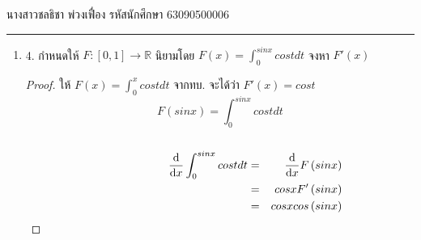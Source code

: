 \documentclass[12pt, a4paper]{article}
\begin{document}
\raggedleft นางสาวชลธิชา พ่วงเฟื่อง  รหัสนักศึกษา 63090500006 \\[12pt]
\hrule\vspace{12pt}
\raggedright

\begin{enumerate}
    \item 4. กำหนดให้ $F:[0,1]\rightarrow \mathbb{R}$ นิยามโดย $F\left ( x \right )=\int_{0}^{sin x} cos t dt$ จงหา ${F}'\left ( x \right )$\indent \\
    \begin{proof}  
        \hspace{1cm} ให้ $F\left ( x \right )=\int_{0}^{ x} cos t dt$ จากทบ. จะได้ว่า ${F}'\left ( x \right )=cos t $\\
        \hspace{2.2cm} $$F\left ( sin x \right )=\int_{0}^{ sin x} cos t dt$$ \\
    \begin{eqnarray*}
        \hspace{2.2cm} \frac{\mathrm{d} }{\mathrm{d} x}\int_{0}^{sin x} cos t dt &=& \frac{\mathrm{d} }{\mathrm{d} x}F\left ( sin x \right )\\
        &=&cos x {F}'\left ( sinx \right )\\
        &=&cos x  cos\left ( sinx \right )\\
    \end{eqnarray*}
    \end{proof}

\end{enumerate}
\end{document}
